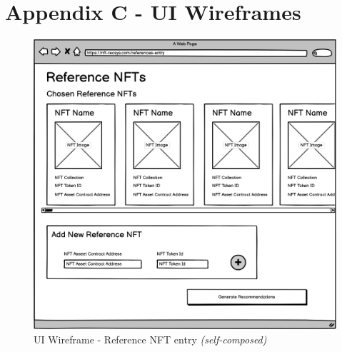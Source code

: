 
\chapter{Appendix C - UI Wireframes}
\label{appendix:UI-Wireframes}

\begin{figure}[h!]
\centering
\includegraphics[width=\textwidth]{images/appendix/UI Wireframes/Reference NFT entry.png}
\caption{UI Wireframe - Reference NFT entry \textit{(self-composed)}}
\end{figure}

